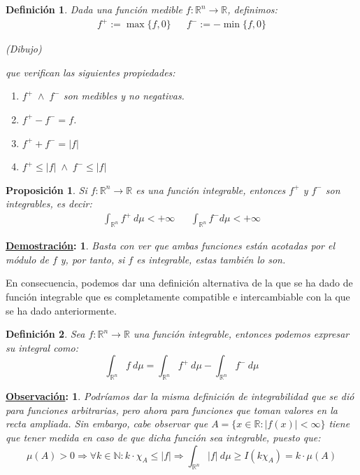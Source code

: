 \documentclass[10pt,a4paper,openright]{book}
\theoremstyle{break}
\newtheorem*{defi}{Definición}
\newtheorem*{prop}{Proposición}
\newtheorem*{demo}{\underline{Demostración}:}
\newtheorem*{obs}{\underline{Observación}:}
\newcommand{\dif}[1]{\ d#1}
\begin{document}
\begin{defi}
Dada una función medible $f: \mathbb{R}^{n} \rightarrow \mathbb{R}$, definimos:
\begin{align*}
f^+ := \max \{f, 0 \} & & f^- := -\min \{f, 0\}
\end{align*}

(\textit{Dibujo})

que verifican las siguientes propiedades:
\begin{enumerate}
\item $f^+ \; \land \; f^-$ son medibles y no negativas.
\item $f^+ - f^- = f$. 
\item $f^+ + f^- = \vert f \vert$
\item $f^+ \le \vert f \vert\; \land \;f^- \le \vert f \vert$ 
\end{enumerate}    
\end{defi}

\begin{prop}
Si $f: \mathbb{R}^n\rightarrow\mathbb{R}$ es una función integrable, entonces $f^+$ y $f^-$ son integrables, es decir:
\begin{align*}
\int_{\mathbb{R}^n} f^+ \dif{\mu} < +\infty & & \int_{\mathbb{R}^n} f^- d \mu < +\infty
\end{align*}
\end{prop}
\begin{demo}
Basta con ver que ambas funciones están acotadas por el módulo de $f$ y, por tanto, si $f$ es integrable, estas también lo son.
\end{demo}

En consecuencia, podemos dar una definición alternativa de la que se ha dado de función integrable que es completamente compatible e intercambiable con la que se ha dado anteriormente.

\begin{defi}
Sea $f: \mathbb{R}^{n} \rightarrow \mathbb{R}$ una función integrable, entonces podemos expresar su integral como: 
$$\int_{\mathbb{R}^n} f \dif{\mu} = \int_{\mathbb{R}^n} f^+ \dif{\mu} - \int_{\mathbb{R}^n} f^- \dif{\mu}$$
\end{defi}

\begin{obs}
Podríamos dar la misma definición de integrabilidad que se dió para funciones arbitrarias, pero ahora para funciones que toman valores en la recta ampliada. Sin embargo, cabe observar que $A=\{x\in \mathbb{R}: |f(x)|< \infty\}$ tiene que tener medida en caso de que dicha función sea integrable, puesto que:
$$\mu(A) > 0 \Rightarrow \forall k \in \mathbb{N}: k\cdot \chi_A \leq |f| \Rightarrow \int_{\mathbb{R}^n} |f| \ d\mu \geq I(k\chi_A) = k \cdot \mu(A)$$
\end{obs}
\end{document}
